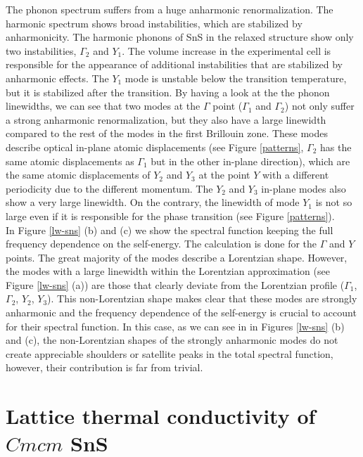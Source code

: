 The phonon spectrum suffers from a huge anharmonic renormalization. The harmonic spectrum shows broad instabilities, which are stabilized by anharmonicity.
The harmonic phonons of SnS in the relaxed structure show only two instabilities, $\Gamma_{2}$ and $Y_{1}$. The volume increase in the experimental cell is responsible for the
appearance of additional instabilities that are stabilized by anharmonic effects.
The $Y_{1}$ mode is unstable below the transition temperature, but it is
stabilized after the transition. By having a look at the the phonon linewidths, we can see that two modes at the $\Gamma$ point ($\Gamma_{1}$ and $\Gamma_{2}$) not only suffer a strong anharmonic renormalization, but they also
have a  large linewidth compared to the rest of the modes in the first Brillouin zone. These modes describe optical in-plane atomic displacements (see Figure \ref{patterns}, $\Gamma_{2}$ has the same atomic displacements
as $\Gamma_{1}$ but in the other in-plane direction), which are the same atomic displacements of $Y_{2}$ and $Y_{3}$ at the point $Y$ with a different periodicity due to the different momentum. The $Y_2$ and $Y_3$ in-plane modes
also show a very large linewidth. On the contrary, the linewidth of mode $Y_{1}$ is not so large even if it is responsible for the phase transition (see Figure \ref{patterns}). \\

In Figure \ref{lw-sns} (b) and (c) we show the spectral function keeping the full frequency
dependence on the self-energy. The calculation is done for the $\Gamma$ and $Y$ points. The great majority of the modes describe a Lorentzian shape. However, the modes with a large linewidth within
the Lorentzian approximation (see Figure \ref{lw-sns} (a)) are those that clearly deviate from the  Lorentzian profile ($\Gamma_{1}$, $\Gamma_{2}$, $Y_{2}$, $Y_{3}$). This non-Lorentzian shape makes clear that these modes are 
strongly anharmonic and the frequency dependence of the self-energy is crucial to account for their spectral function. In this case, as we can see in in Figures \ref{lw-sns} (b) and (c), the non-Lorentzian shapes of the 
strongly anharmonic modes do not create appreciable shoulders or satellite peaks in the total spectral function, however, their contribution is far from trivial.

\section{Lattice thermal conductivity of $Cmcm$ SnS}

